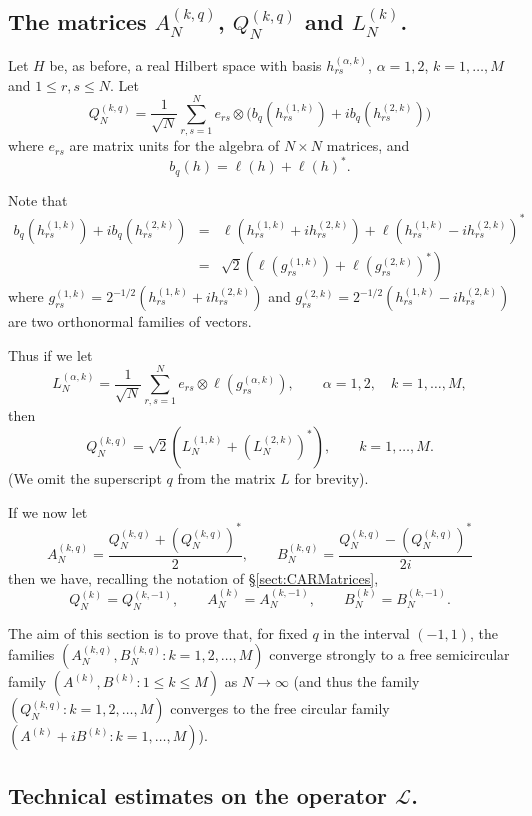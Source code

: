 \documentclass[11pt]{article}
\begin{document}
\subsection{The matrices $A_N^{(k,q)}$, $Q_N^{(k,q)}$ and $L_N^{(k)}$.\label{subseq:qMatrices}}
Let $H$ be, as before, a real Hilbert space with basis $h_{rs}^{(\alpha,k)}$, $\alpha=1,2$, $k=1,\dots,M$ and $1\leq r,s \leq N$. Let
\[
Q_N^{(k,q)} = \frac{1}{\sqrt{N}} \sum_{r,s=1}^N e_{rs} \otimes 
\bigl( b_q (h_{rs}^{(1,k)}) + i b_q(h_{rs}^{(2,k)}))
\]
where $e_{rs}$ are matrix units for the algebra of $N\times N$ matrices, and 
$$
b_q (h) = \ell(h)+\ell(h)^*.$$

Note that \begin{eqnarray*}
    b_q (h_{rs}^{(1,k)}) + i b_q(h_{rs}^{(2,k)}) &=& \ell(h_{rs}^{(1,k)} + i h_{rs}^{(2,k)})  
+ \ell(h_{rs}^{(1,k)} -i  h_{rs}^{(2,k)})^* \\
&=& \sqrt{2}(\ell(g_{rs}^{(1,k)}) + \ell(g_{rs}^{(2,k)})^*)
\end{eqnarray*}
where $ g_{rs}^{(1,k)} = 2^{-1/2}(h_{rs}^{(1,k)} + i  h_{rs}^{(2,k)}) $
and $g_{rs}^{(2,k)} = 2^{-1/2} (h_{rs}^{(1,k)} -i  h_{rs}^{(2,k)})$ are two orthonormal families of vectors. 

Thus if we let \[
L_N^{(\alpha,k)} = \frac{1}{\sqrt{N}} \sum_{r,s=1}^N e_{rs}\otimes \ell ( g_{rs}^{(\alpha,k)}),\qquad \alpha=1,2,\quad k=1,\dots,M,
\]
then \[
Q_N^{(k,q)} = \sqrt{2}(L_N^{(1,k)} + (L_N^{(2,k)})^*),\qquad k=1,\dots,M.
\]
(We omit the superscript $q$ from the matrix $L$ for brevity).  

If we now let 
$$A_N^{(k,q)} = \frac{Q_N^{(k,q)} + (Q_N^{(k,q)})^*}{2}, \qquad 
B_N^{(k,q)} = \frac{Q_N^{(k,q)} - (Q_N^{(k,q)})^*}{2i} $$ then we have, recalling the notation of \S\ref{sect:CARMatrices},
\[
Q_N^{(k)} = Q_N^{(k,-1)},\qquad A_N^{(k)} = A_N^{(k,-1)},\qquad B_N^{(k)} = B_N^{(k,-1)}.
\]

The aim of this section is to prove that, for fixed $q$ in the interval $(-1,1)$,
the families $(A_N^{(k,q)}, B_N^{(k,q)}:k=1,2,\dots,M)$ converge strongly to a free semicircular family $(A^{(k)}, B^{(k)}:1\leq k\leq M)$ as $N\to\infty$ (and thus the family  $(Q_N^{(k,q)}: k=1,2,\dots,M)$ converges to the free circular family $(A^{(k)}+i B^{(k)}: k=1,\dots,M)$).



\subsection{Technical estimates on the operator $\mathscr{L}$.}
\end{document}
